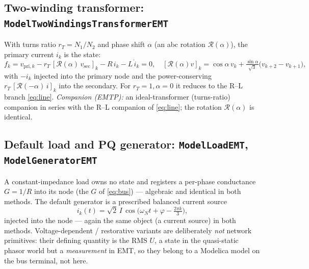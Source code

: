 \documentclass[11pt]{article}
\begin{document}
\subsection{Two-winding transformer: \texttt{ModelTwoWindingsTransformerEMT}}
With turns ratio $r_T=N_1/N_2$ and phase shift $\alpha$ (an abc rotation
$\mathcal R(\alpha)$), the primary current $i_k$ is the state:
\begin{equation}
f_k=v_{\mathrm{pri},k}-r_T\,[\mathcal R(\alpha)\,v_{\mathrm{sec}}]_k-R\,i_k-L\,\dot i_k=0,
\quad
[\mathcal R(\alpha)v]_k=\cos\alpha\,v_k+\tfrac{\sin\alpha}{\sqrt3}\big(v_{k+2}-v_{k+1}\big),
\label{eq:tfo}
\end{equation}
with $-i_k$ injected into the primary node and the power-conserving
$r_T\,[\mathcal R(-\alpha)\,i]_k$ into the secondary. For $r_T=1,\alpha=0$ it
reduces to the R--L branch \eqref{eq:line}. \emph{Companion (EMTP):} an
ideal-transformer (turns-ratio) companion in series with the R--L companion of
\eqref{eq:line}; the rotation $\mathcal R(\alpha)$ is identical.

\subsection{Default load and PQ generator: \texttt{ModelLoadEMT}, \texttt{ModelGeneratorEMT}}
A constant-impedance load owns no state and registers a per-phase conductance
$G=1/R$ into its node (the $G$ of \eqref{eq:bus}) --- algebraic and identical in
both methods. The default generator is a prescribed balanced current source
\begin{equation}
i_k(t)=\sqrt2\,I\,\cos\!\big(\omega_N t+\varphi-\tfrac{2\pi k}{3}\big),
\label{eq:gen}
\end{equation}
injected into the node --- again the same object (a current source) in both
methods. Voltage-dependent / restorative variants are deliberately \emph{not}
network primitives: their defining quantity is the RMS $U$, a state in the
quasi-static phasor world but a \emph{measurement} in EMT, so they belong to a
Modelica model on the bus terminal, not here.
\end{document}
